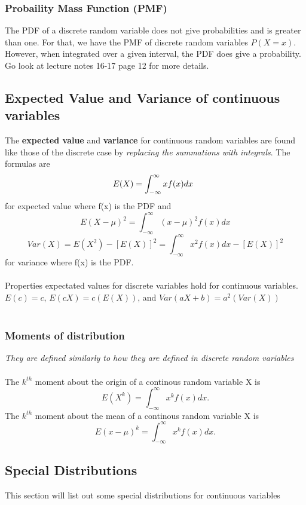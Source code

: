 \documentclass{article}
\begin{document}
\subsubsection{Probaility Mass Function (PMF)}
The PDF of a discrete random variable does not give probabilities and is greater than one. For that, we have the PMF of discrete random variables $P(X=x)$. However, when integrated over a given interval, the PDF does give a probability. Go look at lecture notes 16-17 page 12 for more details.
\subsection{Expected Value and Variance of continuous variables}
The \textbf{expected value} and \textbf{variance} for continuous random variables are found like those of the discrete case by \textit{replacing the summations with integrals}. The formulas are
\[E(X)=\int^\infty_{-\infty}xf(x)dx \hspace{2mm}\]
for expected value where f(x) is the PDF and
\[E(X-\mu)^2=\int^\infty_{-\infty}(x-\mu)^2f(x)dx\]
\[Var(X)=E(X^2)-[E(X)]^2=\int^\infty_{-\infty}x^2f(x)dx-[E(X)]^2\]
for variance where f(x) is the PDF.
\\\\
Properties expectated values for discrete variables hold for continuous variables. $E(c) = c$, $E(cX)=c(E(X))$, and $Var(aX+b)=a^2(Var(X))$\\\\
\subsubsection{Moments of distribution}
\textit{They are defined similarly to how they are defined in discrete random variables}\\\\
The $k^{th}$ moment about the origin of a continous random variable X is \[E(X^k)=\int^\infty_{-\infty}x^kf(x)dx.\]
The $k^{th}$ moment about the mean of a continous random variable X is \[E(x-\mu)^k=\int^\infty_{-\infty}x^kf(x)dx.\]
\subsection{Special Distributions}
This section will list out some special distributions for continuous variables
\end{document}

